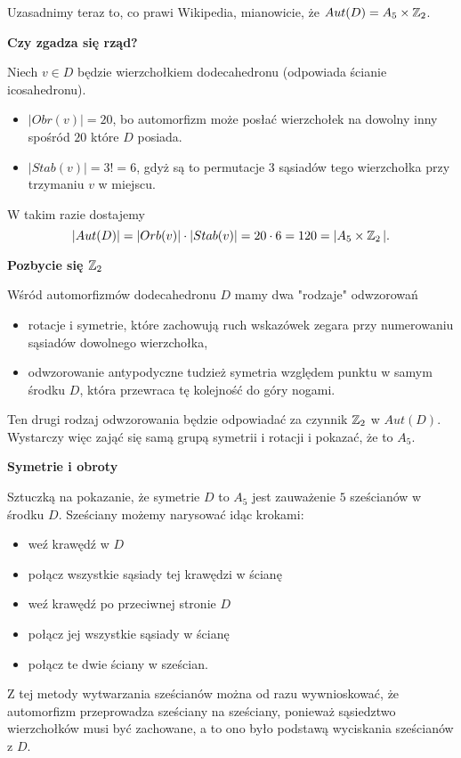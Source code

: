 \begin{wrapfigure}{l}{7cm}

\end{wrapfigure}

Uzasadnimy teraz to, co prawi Wikipedia, mianowicie, że $Aut(D)=A_5\times \operatorname{\mathbb{Z}}_2$.

\textbf{Czy zgadza się rząd?}

Niech $v\in D$ będzie wierzchołkiem dodecahedronu (odpowiada ścianie icosahedronu). 
\begin{itemize}
  \item $|Obr(v)|=20$, bo automorfizm może posłać wierzchołek na dowolny inny spośród $20$ które $D$ posiada.
  \item $|Stab(v)| = 3!=6$, gdyż są to permutacje $3$ sąsiadów tego wierzchołka przy trzymaniu $v$ w miejscu.
\end{itemize}
W takim razie dostajemy
$$|Aut(D)|=|Orb(v)|\cdot|Stab(v)|=20\cdot 6=120=|A_5\times \operatorname{\mathbb{Z}}_2|.$$

\textbf{Pozbycie się $\operatorname{\mathbb{Z}}_2$}

Wśród automorfizmów dodecahedronu $D$ mamy dwa "rodzaje" odwzorowań
\begin{itemize}
  \item rotacje i symetrie, które zachowują ruch wskazówek zegara przy numerowaniu sąsiadów dowolnego wierzchołka,
  \item odwzorowanie antypodyczne tudzież symetria względem punktu w samym środku $D$, która przewraca tę kolejność do góry nogami.
\end{itemize}
Ten drugi rodzaj odwzorowania będzie odpowiadać za czynnik $\operatorname{\mathbb{Z}}_2$ w $Aut(D)$. Wystarczy więc zająć się samą grupą symetrii i rotacji i pokazać, że to $A_5$.

\textbf{Symetrie i obroty}

Sztuczką na pokazanie, że symetrie $D$ to $A_5$ jest zauważenie $5$ sześcianów w środku $D$. Sześciany możemy narysować idąc krokami:
\begin{itemize}
  \item weź krawędź w $D$
  \item połącz wszystkie sąsiady tej krawędzi w ścianę
  \item weź krawędź po przeciwnej stronie $D$
  \item połącz jej wszystkie sąsiady w ścianę
  \item połącz te dwie ściany w sześcian.
\end{itemize}
Z tej metody wytwarzania sześcianów można od razu wywnioskować, że automorfizm przeprowadza sześciany na sześciany, ponieważ sąsiedztwo wierzchołków musi być zachowane, a to ono było podstawą wyciskania sześcianów z $D$.

